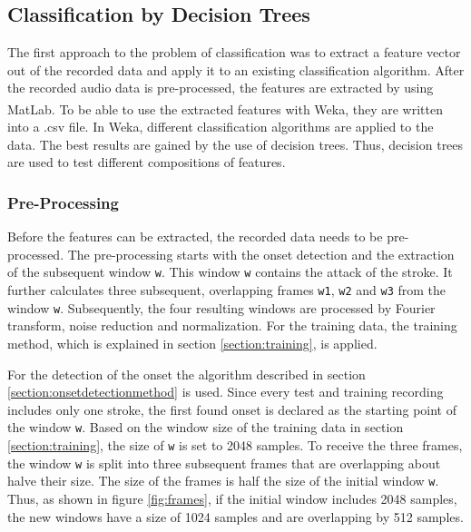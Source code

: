 \subsection{Classification by Decision Trees}
\label{section:method1}

The first approach to the problem of classification was to extract a feature vector out of the recorded data and apply it to an existing classification algorithm. After the recorded audio data is pre-processed, the features are extracted by using MatLab\textsuperscript{\textregistered}. To be able to use the extracted features with Weka, they are written into a .csv file. In Weka, different classification algorithms are applied to the data. The best results are gained by the use of decision trees. Thus, decision trees are used to test different compositions of features.

\subsubsection{Pre-Processing}

\label{section:method1pre-processing}
Before the features can be extracted, the recorded data needs to be pre-processed. The pre-processing starts with the onset detection and the extraction of the subsequent window \lstinline{w}. This window \lstinline{w} contains the attack of the stroke. It further calculates three subsequent, overlapping frames \lstinline{w1}, \lstinline{w2} and \lstinline{w3} from the window \lstinline{w}. Subsequently, the four resulting windows are processed by Fourier transform, noise reduction and normalization. For the training data, the training method, which is explained in section \ref{section:training}, is applied.

For the detection of the onset the algorithm described in section \ref{section:onsetdetectionmethod} is used. Since every test and training recording includes only one stroke, the first found onset is declared as the starting point of the window \lstinline{w}. Based on the window size of the training data in section \ref{section:training}, the size of \lstinline{w} is set to 2048 samples. To receive the three frames, the window \lstinline{w} is split into three subsequent frames that are overlapping about halve their size. The size of the frames is half the size of the initial window \lstinline{w}. Thus, as shown in figure \ref{fig:frames}, if the initial window includes 2048 samples, the new windows have a size of 1024 samples and are overlapping by 512 samples.


